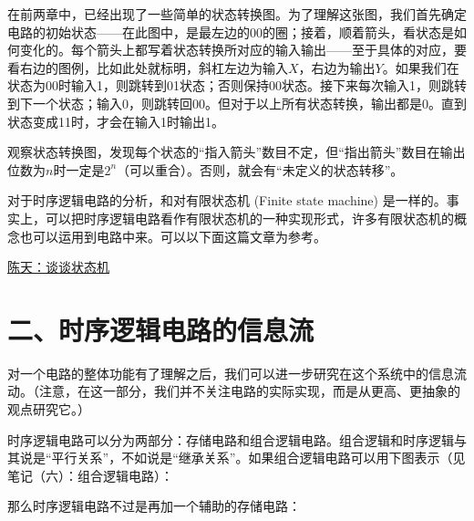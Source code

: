 \documentclass[UTF8]{ctexart}
\begin{document}
在前两章中，已经出现了一些简单的状态转换图。为了理解这张图，我们首先确定电路的初始状态——在此图中，是最左边的00的圈；接着，顺着箭头，看状态是如何变化的。每个箭头上都写着状态转换所对应的输入输出——至于具体的对应，要看右边的图例，比如此处就标明，斜杠左边为输入$X$，右边为输出$Y$。如果我们在状态为00时输入1，则跳转到01状态；否则保持00状态。接下来每次输入1，则跳转到下一个状态；输入0，则跳转回00。但对于以上所有状态转换，输出都是0。直到状态变成11时，才会在输入1时输出1。

观察状态转换图，发现每个状态的“指入箭头”数目不定，但“指出箭头”数目在输出位数为$n$时一定是$2^n$（可以重合）。否则，就会有“未定义的状态转移”。

对于时序逻辑电路的分析，和对有限状态机 (Finite state machine) 是一样的。事实上，可以把时序逻辑电路看作有限状态机的一种实现形式，许多有限状态机的概念也可以运用到电路中来。可以以下面这篇文章为参考。

\href{https://zhuanlan.zhihu.com/p/28142401}{陈天：谈谈状态机}

\section*{二、时序逻辑电路的信息流}
对一个电路的整体功能有了理解之后，我们可以进一步研究在这个系统中的信息流动。（注意，在这一部分，我们并不关注电路的实际实现，而是从更高、更抽象的观点研究它。）

时序逻辑电路可以分为两部分：存储电路和组合逻辑电路。组合逻辑和时序逻辑与其说是“平行关系”，不如说是“继承关系”。如果组合逻辑电路可以用下图表示（见笔记（六）：组合逻辑电路）：

\begin{figure}
\end{figure}

那么时序逻辑电路不过是再加一个辅助的存储电路：
\end{document}
